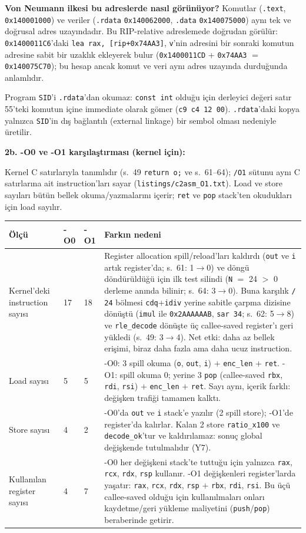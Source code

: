 \documentclass[11pt,a4paper]{article}
\newcommand{\tl}{\texttt}
\newcommand{\hd}[1]{\cellcolor{hdr}#1}
\begin{document}
\textbf{Von Neumann ilkesi bu adreslerde nasıl görünüyor?} Komutlar (\tl{.text},
\tl{0x140001000}) ve veriler (\tl{.rdata} \tl{0x140062000}, \tl{.data} \tl{0x140075000}) aynı tek
ve doğrusal adres uzayındadır. Bu RIP-relative adreslemede doğrudan görülür: \tl{0x1400011C6}'daki
\tl{lea rax, [rip+0x74AA3]}, \tl{v}'nin adresini bir sonraki komutun adresine sabit bir uzaklık
ekleyerek bulur (\tl{0x1400011CD} + \tl{0x74AA3} $=$ \tl{0x140075C70}); bu hesap ancak komut ve
veri aynı adres uzayında durduğunda anlamlıdır.

Program \tl{SID}'i \tl{.rdata}'dan okumaz: \tl{const int} olduğu için derleyici değeri satır
55'teki komutun içine immediate olarak gömer (\tl{c9 c4 12 00}). \tl{.rdata}'daki kopya yalnızca
\tl{SID}'in dış bağlantılı (external linkage) bir sembol olması nedeniyle üretilir.

\textbf{2b. -O0 ve -O1 karşılaştırması (kernel için):}

Kernel C satırlarıyla tanımlıdır (s.~49 \tl{return o;} ve s.~61--64); \tl{/O1} sütunu aynı C
satırlarına ait instruction'ları sayar (\tl{listings/c2asm\_O1.txt}). Load ve store sayıları
bütün bellek okuma/yazmalarını içerir; \tl{ret} ve \tl{pop} stack'ten okudukları için load sayılır.

{\small
\begin{longtable}{|p{3.4cm}|p{1.0cm}|p{1.0cm}|p{9.0cm}|}
\hline
\hd{Ölçü} & \hd{-O0} & \hd{-O1} & \hd{Farkın nedeni}\\
\hline
\endhead
Kernel'deki instruction sayısı & 17 & 18 & Register allocation spill/reload'ları kaldırdı (\tl{out} ve \tl{i} artık register'da; s.~61: 1$\to$0) ve döngü döndürüldüğü için ilk test silindi (\tl{N} $=$ 24 $>$ 0 derleme anında bilinir; s.~64: 3$\to$0). Buna karşılık \tl{/ 24} bölmesi \tl{cdq}+\tl{idiv} yerine sabitle çarpma dizisine dönüştü (\tl{imul} ile \tl{0x2AAAAAAB}, \tl{sar 34}; s.~62: 5$\to$8) ve \tl{rle\_decode} dönüşte üç callee-saved register'ı geri yükledi (s.~49: 3$\to$4). Net etki: daha az bellek erişimi, biraz daha fazla ama daha ucuz instruction.\\
\hline
Load sayısı & 5 & 5 & -O0: 3 spill okuma (\tl{o}, \tl{out}, \tl{i}) $+$ \tl{enc\_len} $+$ \tl{ret}. -O1: spill okuma 0; yerine 3 \tl{pop} (callee-saved \tl{rbx}, \tl{rdi}, \tl{rsi}) $+$ \tl{enc\_len} $+$ \tl{ret}. Sayı aynı, içerik farklı: değişken trafiği tamamen kalktı.\\
\hline
Store sayısı & 4 & 2 & -O0'da \tl{out} ve \tl{i} stack'e yazılır (2 spill store); -O1'de register'da kalırlar. Kalan 2 store \tl{ratio\_x100} ve \tl{decode\_ok}'tur ve kaldırılamaz: sonuç global değişkende tutulmalıdır (Y7).\\
\hline
Kullanılan register sayısı & 4 & 7 & -O0 her değişkeni stack'te tuttuğu için yalnızca \tl{rax}, \tl{rcx}, \tl{rdx}, \tl{rsp} kullanır. -O1 değişkenleri register'larda yaşatır: \tl{rax}, \tl{rcx}, \tl{rdx}, \tl{rsp} $+$ \tl{rbx}, \tl{rdi}, \tl{rsi}. Bu üçü callee-saved olduğu için kullanılmaları onları kaydetme/geri yükleme maliyetini (\tl{push}/\tl{pop}) beraberinde getirir.\\
\hline
\end{longtable}
}
\end{document}
